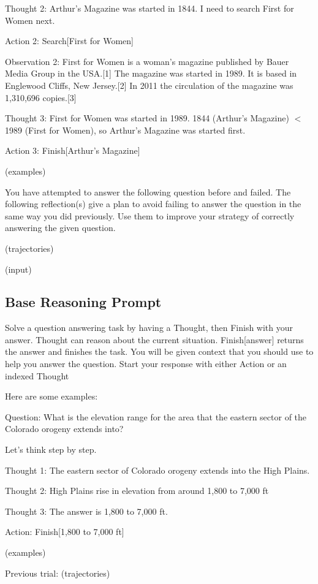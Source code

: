 {Thought 2: Arthur's Magazine was started in 1844. I need to search First for Women next.

Action 2: Search[First for Women]

Observation 2: First for Women is a woman's magazine published by Bauer Media Group in the USA.[1] The magazine was started in 1989. It is based in Englewood Cliffs, New Jersey.[2] In 2011 the circulation of the magazine was 1,310,696 copies.[3]

Thought 3: First for Women was started in 1989. 1844 (Arthur's Magazine) $<$ 1989 (First for Women), so Arthur's Magazine was started first. 

Action 3: Finish[Arthur's Magazine]

(examples)

You have attempted to answer the following question before and failed. The following reflection(s) give a plan to avoid failing to answer the question in the same way you did previously. Use them to improve your strategy of correctly answering the given question.

(trajectories)

(input)

\subsection{Base Reasoning Prompt}

Solve a question answering task by having a Thought, then Finish with your answer. Thought can reason about the current situation. Finish[answer] returns the answer and finishes the task. You will be given context that you should use to help you answer the question. Start your response with either Action or an indexed Thought

Here are some examples:

Question: What is the elevation range for the area that the eastern sector of the Colorado orogeny extends into? 

Let's think step by step.

Thought 1: The eastern sector of Colorado orogeny extends into the High Plains. 

Thought 2: High Plains rise in elevation from around 1,800 to 7,000 ft

Thought 3: The answer is 1,800 to 7,000 ft.

Action: Finish[1,800 to 7,000 ft]

(examples)

Previous trial:
(trajectories)

}
